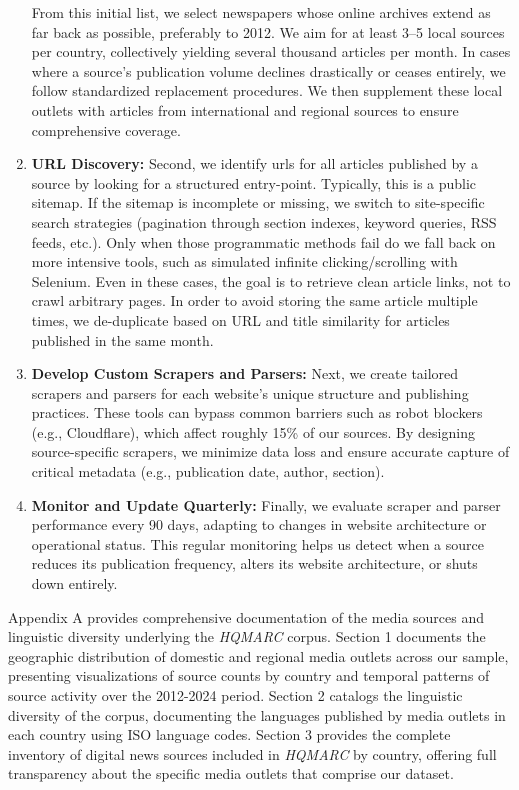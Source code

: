 \documentclass[
  letterpaper,
  DIV=11,
  numbers=noendperiod]{scrartcl}
\begin{document}
\begin{enumerate}
  From this initial list, we select newspapers whose online archives
  extend as far back as possible, preferably to 2012. We aim for at
  least 3--5 local sources per country, collectively yielding several
  thousand articles per month. In cases where a source's publication
  volume declines drastically or ceases entirely, we follow standardized
  replacement procedures. We then supplement these local outlets with
  articles from international and regional sources to ensure
  comprehensive coverage.
\item
  \textbf{URL Discovery:} Second, we identify urls for all articles
  published by a source by looking for a structured entry-point.
  Typically, this is a public sitemap. If the sitemap is incomplete or
  missing, we switch to site-specific search strategies (pagination
  through section indexes, keyword queries, RSS feeds, etc.). Only when
  those programmatic methods fail do we fall back on more intensive
  tools, such as simulated infinite clicking/scrolling with Selenium.
  Even in these cases, the goal is to retrieve clean article links, not
  to crawl arbitrary pages. In order to avoid storing the same article
  multiple times, we de-duplicate based on URL and title similarity for
  articles published in the same month.
\item
  \textbf{Develop Custom Scrapers and Parsers:} Next, we create tailored
  scrapers and parsers for each website's unique structure and
  publishing practices. These tools can bypass common barriers such as
  robot blockers (e.g., Cloudflare), which affect roughly 15\% of our
  sources. By designing source-specific scrapers, we minimize data loss
  and ensure accurate capture of critical metadata (e.g., publication
  date, author, section).
\item
  \textbf{Monitor and Update Quarterly:} Finally, we evaluate scraper
  and parser performance every 90 days, adapting to changes in website
  architecture or operational status. This regular monitoring helps us
  detect when a source reduces its publication frequency, alters its
  website architecture, or shuts down entirely.
\end{enumerate}

Appendix A provides comprehensive documentation of the media sources and
linguistic diversity underlying the \emph{HQMARC} corpus. Section 1
documents the geographic distribution of domestic and regional media
outlets across our sample, presenting visualizations of source counts by
country and temporal patterns of source activity over the 2012-2024
period. Section 2 catalogs the linguistic diversity of the corpus,
documenting the languages published by media outlets in each country
using ISO language codes. Section 3 provides the complete inventory of
digital news sources included in \emph{HQMARC} by country, offering full
transparency about the specific media outlets that comprise our dataset.
\end{document}
